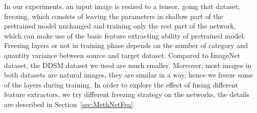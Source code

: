 In our experiments, an input image is 
resized to a tensor, going that dataset; 
freezing, which consists of leaving the 
parameters in shallow part of the 
pretrained model unchanged and training 
only the rest part of the network, which can 
make use of the basic feature extracting 
ability of pretrained model. Freezing layers 
or not in training phase depends on the 
number of category and quantity variance 
between source and target dataset. 
Compared to ImageNet dataset, the DDSM 
dataset we used are much smaller. 
Moreover, most images in both datasets 
are natural images, they are similar in 
a way, hence we freeze some of the layers 
during training. In order to explore the 
effect of fusing different feature extractors, 
we try different freezing strategy on the 
networks, the details are described in 
Section~\ref{sec:MethNetFea}. 
